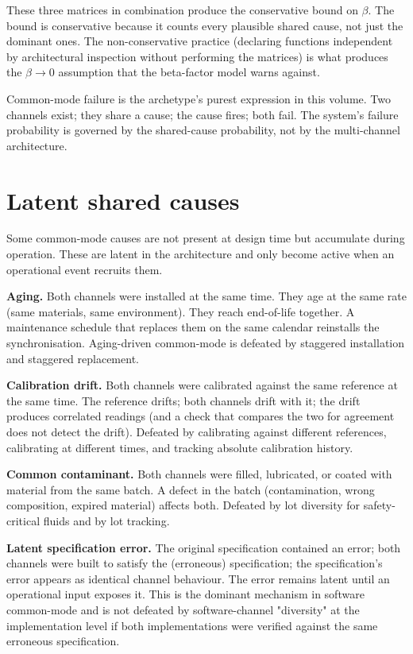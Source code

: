 These three matrices in combination produce the conservative bound on $\beta$. The bound is conservative because it counts every plausible shared cause, not just the dominant ones. The non-conservative practice (declaring functions independent by architectural inspection without performing the matrices) is what produces the $\beta \to 0$ assumption that the beta-factor model warns against.

\begin{archetype}[failure]
Common-mode failure is the archetype's purest expression in this volume. Two channels exist; they share a cause; the cause fires; both fail. The system's failure probability is governed by the shared-cause probability, not by the multi-channel architecture.
\end{archetype}

\section{Latent shared causes}

Some common-mode causes are not present at design time but accumulate during operation. These are latent in the architecture and only become active when an operational event recruits them.

\textbf{Aging.} Both channels were installed at the same time. They age at the same rate (same materials, same environment). They reach end-of-life together. A maintenance schedule that replaces them on the same calendar reinstalls the synchronisation. Aging-driven common-mode is defeated by staggered installation and staggered replacement.

\textbf{Calibration drift.} Both channels were calibrated against the same reference at the same time. The reference drifts; both channels drift with it; the drift produces correlated readings (and a check that compares the two for agreement does not detect the drift). Defeated by calibrating against different references, calibrating at different times, and tracking absolute calibration history.

\textbf{Common contaminant.} Both channels were filled, lubricated, or coated with material from the same batch. A defect in the batch (contamination, wrong composition, expired material) affects both. Defeated by lot diversity for safety-critical fluids and by lot tracking.

\textbf{Latent specification error.} The original specification contained an error; both channels were built to satisfy the (erroneous) specification; the specification's error appears as identical channel behaviour. The error remains latent until an operational input exposes it. This is the dominant mechanism in software common-mode and is not defeated by software-channel "diversity" at the implementation level if both implementations were verified against the same erroneous specification.

